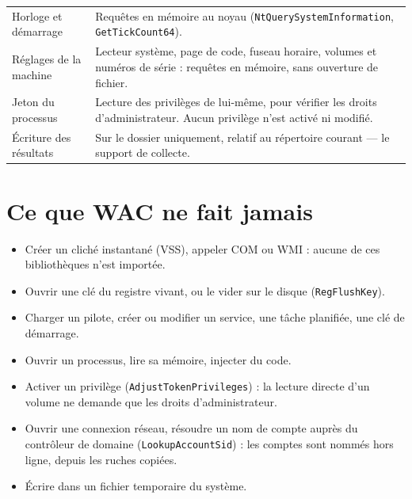\documentclass[11pt,a4paper,oneside]{report}
\begin{document}
\begin{longtable}{@{}L{4.3cm}L{10.1cm}@{}}
Horloge et démarrage & Requêtes en mémoire au noyau
  (\texttt{NtQuerySystemInformation}, \texttt{GetTickCount64}). \\
Réglages de la machine & Lecteur système, page de code, fuseau horaire, volumes
  et numéros de série : requêtes en mémoire, sans ouverture de fichier. \\
Jeton du processus & Lecture des privilèges de \wac{} lui-même, pour vérifier
  les droits d'administrateur. Aucun privilège n'est activé ni modifié. \\
Écriture des résultats & Sur le dossier  uniquement, relatif au
  répertoire courant — le support de collecte. \\
\bottomrule
\end{longtable}


\section{Ce que WAC ne fait jamais}

\begin{itemize}
  \item Créer un cliché instantané (VSS), appeler COM ou WMI : aucune de ces
        bibliothèques n'est importée.
  \item Ouvrir une clé du registre vivant, ou le vider sur le disque
        (\texttt{RegFlushKey}).
  \item Charger un pilote, créer ou modifier un service, une tâche planifiée,
        une clé de démarrage.
  \item Ouvrir un processus, lire sa mémoire, injecter du code.
  \item Activer un privilège (\texttt{AdjustTokenPrivileges}) : la lecture
        directe d'un volume ne demande que les droits d'administrateur.
  \item Ouvrir une connexion réseau, résoudre un nom de compte auprès du
        contrôleur de domaine (\texttt{LookupAccountSid}) : les comptes sont
        nommés hors ligne, depuis les ruches copiées.
  \item Écrire dans un fichier temporaire du système.
\end{itemize}
\end{document}
